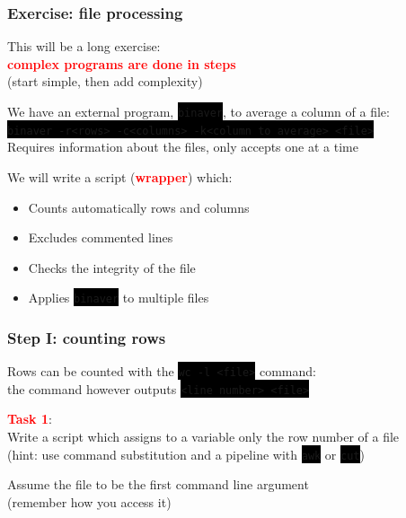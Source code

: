 \documentclass[unknownkeysallowed, 10pt, a4 paper, handout]{beamer}
\newcommand{\focus}[1]{\textbf{\textcolor{red}{#1}}}
\newcommand{\code}[1]{\colorbox{black}{\color{green}\texttt{#1}}}
\begin{document}
\begin{frame}
	\begin{center}
		\frametitle{Exercise: file processing}

		This will be a long exercise:\\
		\focus{complex programs are done in steps}\\
		(start simple, then add complexity)

		\vspace{3mm}
	
		We have an external program, \code{binaver}, to average a column of a file:\\
		\code{binaver -r<rows> -c<columns> -k<column to average> <file>}\\
		Requires information about the files, only accepts one at a time

		\vspace{3mm}

		We will write a script (\focus{wrapper}) which:

		\begin{itemize}
			\item Counts automatically rows and columns
			\item Excludes commented lines
			\item Checks the integrity of the file
			\item Applies \code{binaver} to multiple files
		\end{itemize}
	\end{center}
\end{frame}

\begin{frame}
	\begin{center}
		\frametitle{Step I: counting rows}

		Rows can be counted with the \code{wc -l <file>} command:\\
		the command however outputs \code{<line number> <file>}

		\vspace{8mm}

		\focus{Task 1}:\\
		Write a script which assigns to a variable only the row number of a file\\
		(hint: use command substitution and a pipeline with \code{awk} or \code{cut})

		Assume the file to be the first command line argument\\
		(remember how you access it)
	\end{center}
\end{frame}
\end{document}

